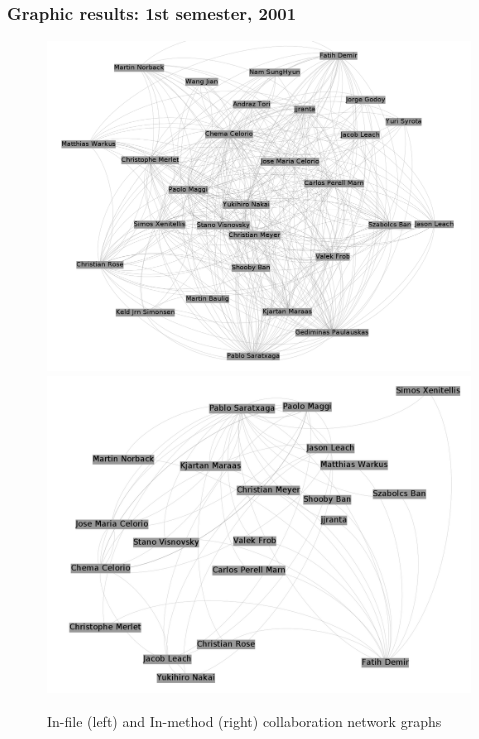 \documentclass{beamer}
\begin{document}
\begin{frame}
\frametitle{Graphic results: 1st semester, 2001}
\begin{figure}[h!]
\begin{center}
\includegraphics[scale=0.12]{g2001files.png} 
\includegraphics[scale=0.12]{g2001methods.png}
\caption{In-file (left) and In-method (right) collaboration network graphs}
\label{fig:2001}
\end{center}
\end{figure}
\end{frame}
\end{document}
